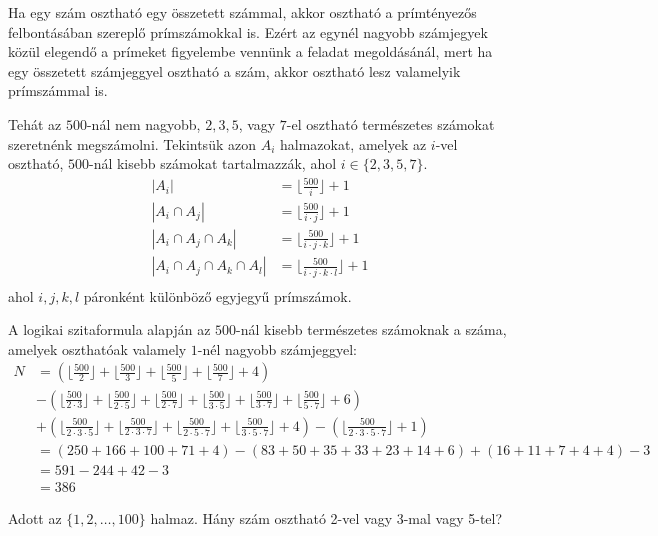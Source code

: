 \begin{solution}
Ha egy szám osztható egy összetett számmal, akkor osztható a prímtényezős
felbontásában szereplő prímszámokkal is. Ezért az egynél nagyobb számjegyek
közül elegendő a prímeket figyelembe vennünk a feladat megoldásánál,
mert ha egy összetett számjeggyel osztható a szám, akkor osztható
lesz valamelyik prímszámmal is.

Tehát az $500$-nál nem nagyobb, $2,3,5$, vagy $7$-el osztható természetes
számokat szeretnénk megszámolni. Tekintsük azon $A_{i}$ halmazokat,
amelyek az $i$-vel osztható, $500$-nál kisebb számokat tartalmazzák,
ahol $i\in\{2,3,5,7\}$. 
\begin{align*}
|A_{i}| & =\lfloor\frac{500}{i}\rfloor+1\\
|A_{i}\cap A_{j}| & =\lfloor\frac{500}{i\cdot j}\rfloor+1\\
|A_{i}\cap A_{j}\cap A_{k}| & =\lfloor\frac{500}{i\cdot j\cdot k}\rfloor+1\\
|A_{i}\cap A_{j}\cap A_{k}\cap A_{l}| & =\lfloor\frac{500}{i\cdot j\cdot k\cdot l}\rfloor+1\\
\end{align*}
ahol $i,j,k,l$ páronként különböző egyjegyű prímszámok.

A logikai szitaformula alapján az $500$-nál kisebb természetes számoknak
a száma, amelyek oszthatóak valamely $1$-nél nagyobb számjeggyel:
\begin{align*}
N & =(\lfloor\frac{500}{2}\rfloor+\lfloor\frac{500}{3}\rfloor+\lfloor\frac{500}{5}\rfloor+\lfloor\frac{500}{7}\rfloor+4)\\
 & -(\lfloor\frac{500}{2\cdot3}\rfloor+\lfloor\frac{500}{2\cdot5}\rfloor+\lfloor\frac{500}{2\cdot7}\rfloor+\lfloor\frac{500}{3\cdot5}\rfloor+\lfloor\frac{500}{3\cdot7}\rfloor+\lfloor\frac{500}{5\cdot7}\rfloor+6)\\
 & +(\lfloor\frac{500}{2\cdot3\cdot5}\rfloor+\lfloor\frac{500}{2\cdot3\cdot7}\rfloor+\lfloor\frac{500}{2\cdot5\cdot7}\rfloor+\lfloor\frac{500}{3\cdot5\cdot7}\rfloor+4)-(\lfloor\frac{500}{2\cdot3\cdot5\cdot7}\rfloor+1)\\
 & =(250+166+100+71+4)-(83+50+35+33+23+14+6)+(16+11+7+4+4)-3\\
 & =591-244+42-3\\
 & =386
\end{align*}
\end{solution}
\begin{extraproblem}
Adott az $\{1,2,\dots,100\}$ halmaz. Hány szám osztható 2-vel vagy
3-mal vagy 5-tel? 
\end{extraproblem}

